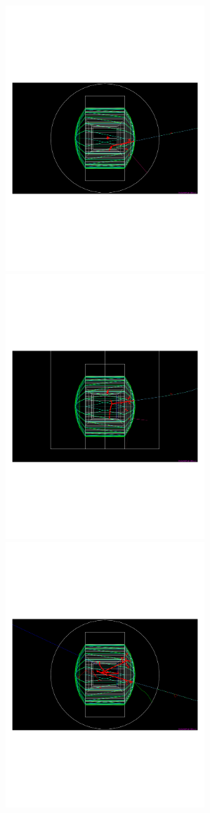 \begin{figure}[htbp]
\begin{center}
  	\includegraphics[width=75mm]{Chapter4/figures/eventDisplay_event9_viewXZ.pdf} 
  	\includegraphics[width=75mm]{Chapter4/figures/eventDisplay_event9_viewYZ.pdf} \\
	\vspace{3mm}
  	\includegraphics[width=75mm]{Chapter4/figures/eventDisplay_event10_viewXZ.pdf} 

\end{center}
\end{figure}
